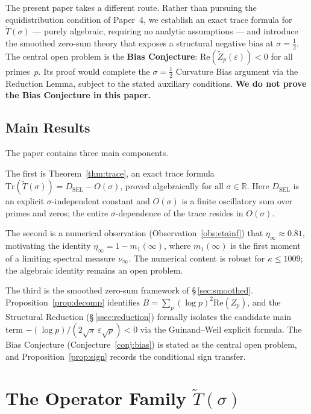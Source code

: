 \documentclass[11pt]{article}
\newcommand{\Tt}{\widetilde{T}}
\newcommand{\Zt}{\widetilde{Z}}
\newcommand{\DSEL}{D_{\mathrm{SEL}}}
\begin{document}
The present paper takes a different route.
Rather than pursuing the equidistribution condition of Paper~4,
we establish an exact trace formula for $\Tt(\sigma)$ --- purely
algebraic, requiring no analytic assumptions --- and introduce
the smoothed zero-sum theory that exposes a structural negative
bias at $\sigma=\tfrac{1}{2}$.
The central open problem is the \textbf{Bias Conjecture}:
$\mathrm{Re}(\Zt_p(\varepsilon))<0$ for all primes~$p$.
Its proof would complete the $\sigma=\tfrac{1}{2}$ Curvature Bias
argument via the Reduction Lemma, subject to the stated auxiliary
conditions.
\textbf{We do not prove the Bias Conjecture in this paper.}

\subsection{Main Results}

The paper contains three main components.

The first is Theorem~\ref{thm:trace}, an exact trace formula
$\mathrm{Tr}(\Tt(\sigma)) = \DSEL - O(\sigma)$,
proved algebraically for all $\sigma\in\mathbb{R}$.
Here $\DSEL$ is an explicit $\sigma$-independent constant and
$O(\sigma)$ is a finite oscillatory sum over primes and zeros;
the entire $\sigma$-dependence of the trace resides in $O(\sigma)$.

The second is a numerical observation (Observation~\ref{obs:etainf})
that $\eta_\infty\approx 0.81$, motivating the identity
$\eta_\infty = 1-m_1(\infty)$, where $m_1(\infty)$ is the first
moment of a limiting spectral measure $\nu_\infty$.
The numerical content is robust for $\kappa\leq 1009$;
the algebraic identity remains an open problem.

The third is the smoothed zero-sum framework of \S\,\ref{sec:smoothed}.
Proposition~\ref{prop:decomp} identifies
$B = \sum_p(\log p)^2\mathrm{Re}(Z_p)$,
and the Structural Reduction (\S\,\ref{ssec:reduction}) formally isolates
the candidate main term $-(\log p)/(2\sqrt{\pi}\,\varepsilon\sqrt{p})<0$
via the Guinand--Weil explicit formula.
The Bias Conjecture (Conjecture~\ref{conj:bias}) is stated as the
central open problem, and Proposition~\ref{prop:sign} records the
conditional sign transfer.

\section{The Operator Family \texorpdfstring{$\Tt(\sigma)$}{T-tilde(sigma)}}
\label{sec:ops}
\end{document}
